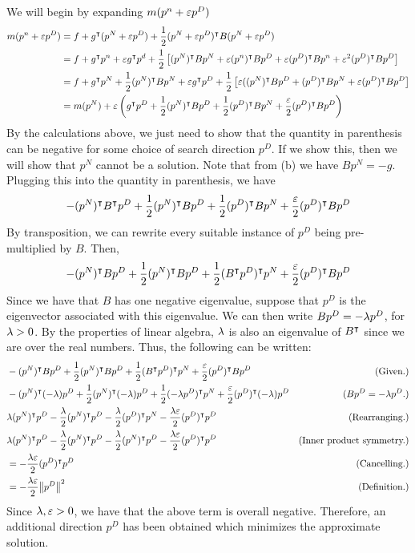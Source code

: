 \begin{solution}

    We will begin by expanding $m(p^n + \varepsilon p^D)$
    \tightalignbreak
    \begin{align*}
        m(p^n + \varepsilon p^D) &= f + g^\intercal (p^N + \varepsilon p^D) + \frac{1}{2}(p^N + \varepsilon p^D)^\intercal B(p^N + \varepsilon p^D)\\
        &= f + g^\intercal p^n + \varepsilon g^\intercal p^d + \frac{1}{2}\left[(p^N)^\intercal Bp^N + \varepsilon(p^n)^\intercal Bp^D + \varepsilon (p^D)^\intercal Bp^n + \varepsilon^2 (p^D)^\intercal Bp^D \right]\\
        &= f + g^\intercal p^N + \frac{1}{2} (p^N)^\intercal Bp^N + \varepsilon g^\intercal p^D + \frac{1}{2}\left[ \varepsilon((p^N)^\intercal Bp^D + (p^D)^\intercal Bp^N + \varepsilon (p^D)^\intercal Bp^D\right]\\
        &= m(p^N) + \varepsilon \left( g^\intercal p^D + \frac{1}{2}(p^N)^\intercal Bp^D + \frac{1}{2}(p^D)^\intercal Bp^N + \frac{\varepsilon}{2}(p^D)^\intercal Bp^D\right) 
    \end{align*}
    \vspace{-6mm} \alignbreak
    By the calculations above, we just need to show that the quantity in parenthesis can be negative for some choice of search direction $p^D$. If we show this, then we will show that $p^N$ cannot be a solution. Note that from (b) we have $Bp^N = -g$. Plugging this into the quantity in parenthesis, we have
    \[ -(p^N)^\intercal B^\intercal p^D + \frac{1}{2}(p^N)^\intercal Bp^D + \frac{1}{2}(p^D)^\intercal Bp^N + \frac{\varepsilon}{2}(p^D)^\intercal Bp^D\]
    By transposition, we can rewrite every suitable instance of $p^D$ being pre-multiplied by $B$. Then, 
    \[ -(p^N)^\intercal  Bp^D + \frac{1}{2}(p^N)^\intercal Bp^D + \frac{1}{2}(B^\intercal p^D)^\intercal p^N + \frac{\varepsilon}{2}(p^D)^\intercal Bp^D\]
    Since we have that $B$ has one negative eigenvalue, suppose that $p^D$ is the eigenvector associated with this eigenvalue. We can then write $Bp^D = -\mathrm{\lambda} p^D$, for $\mathrm{\lambda} > 0$. By the properties of linear algebra, $\mathrm{\lambda}$ is also an eigenvalue of $B^\intercal$ since we are over the real numbers. Thus, the following can be written:\\
    \tightalignbreak
    \begin{align*}
        &-(p^N)^\intercal B p^D + \frac{1}{2}(p^N)^\intercal Bp^D + \frac{1}{2}(B^\intercal p^D)^\intercal p^N + \frac{\varepsilon}{2}(p^D)^\intercal Bp^D &\text{(Given.)}\\
        &-(p^N)^\intercal (-\mathrm{\lambda}) p^D + \frac{1}{2}(p^N)^\intercal (-\mathrm{\lambda})p^D + \frac{1}{2}(-\mathrm{\lambda} p^D)^\intercal p^N + \frac{\varepsilon}{2}(p^D)^\intercal (-\mathrm{\lambda})p^D &(Bp^D = -\mathrm{\lambda} p^D.)\\
        &\mathrm{\lambda} (p^N)^\intercal p^D - \frac{\mathrm{\lambda}}{2}(p^N)^\intercal p^D - \frac{\mathrm{\lambda}}{2}(p^D)^\intercal p^N - \frac{\mathrm{\lambda} \varepsilon}{2}(p^D)^\intercal p^D &\text{(Rearranging.)}\\
        &\mathrm{\lambda} (p^N)^\intercal p^D - \frac{\mathrm{\lambda}}{2}(p^N)^\intercal p^D - \frac{\mathrm{\lambda}}{2}(p^N)^\intercal p^D - \frac{\mathrm{\lambda} \varepsilon}{2}(p^D)^\intercal p^D &\text{(Inner product symmetry.)}\\
        &= - \frac{\mathrm{\lambda} \varepsilon}{2}(p^D)^\intercal p^D &\text{(Cancelling.)}\\
        &= -\frac{\mathrm{\lambda}\varepsilon}{2}\norm{p^D}^2 &\text{(Definition.)}
    \end{align*}
    \vspace{-6mm}\alignbreak
    Since $\mathrm{\lambda},  \varepsilon > 0$, we have that the above term is overall negative. Therefore, an additional direction $p^D$ has been obtained which minimizes the approximate solution.
\end{solution}
\newpage
